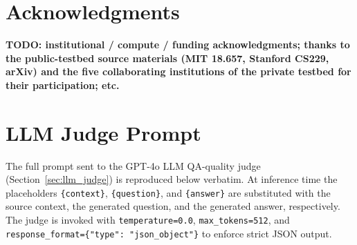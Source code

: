 \documentclass[11pt]{article}
\theoremstyle{plain}
\theoremstyle{definition}
\theoremstyle{remark}
\newcommand{\red}[1]{\textcolor{myred}{\textbf{#1}}}
\begin{document}
\section*{Acknowledgments}

\red{TODO: institutional / compute / funding acknowledgments; thanks to the public-testbed source materials (MIT 18.657, Stanford CS229, arXiv) and the five collaborating institutions of the private testbed for their participation; etc.}



\appendix

\section{LLM Judge Prompt}
\label{app:llm_judge_prompt}

The full prompt sent to the GPT-4o LLM QA-quality judge
(Section~\ref{sec:llm_judge}) is reproduced below verbatim. At
inference time the placeholders
\texttt{\{context\}}, \texttt{\{question\}}, and
\texttt{\{answer\}} are substituted with the source
context, the generated question, and the generated
answer, respectively. The judge is invoked with
\texttt{temperature{=}0.0},
\texttt{max\_tokens{=}512}, and
\texttt{response\_format=\{"type": "json\_object"\}}
to enforce strict JSON output.
\end{document}

